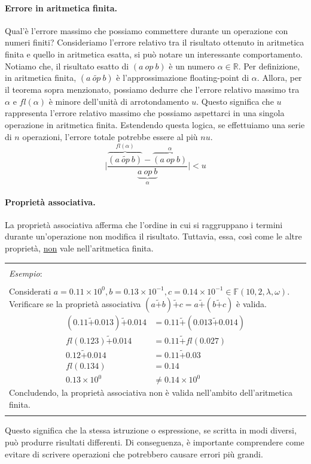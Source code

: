 \documentclass{article}
\numberwithin{equation}{section}
\newenvironment{example}
{\begin{center}
        \begin{tabular}{|p{0.9\textwidth}|}
            \hline \\ 
            \textit{Esempio}: \\\\ 
        }
        {
            \\\\ \hline
        \end{tabular}
    \end{center}
}
\begin{document}
\paragraph{Errore in aritmetica finita.}
Qual'è l'errore massimo che possiamo commettere durante un operazione con numeri
finiti?
Consideriamo l'errore relativo tra il risultato ottenuto in aritmetica finita
e quello in aritmetica esatta, si può notare un interessante comportamento. 
Notiamo che, il risultato esatto di $(a\ op\ b)$ è un numero $\alpha\in
\mathbb{R}$. Per definizione, in aritmetica finita, $(a\ \tilde{op}\ b)$ è
l'approssimazione floating-point di $\alpha$.
Allora, per il teorema sopra menzionato, possiamo dedurre che l'errore relativo massimo tra
$\alpha$ e $fl(\alpha)$ è minore dell'unità di arrotondamento $u$. Questo
significa che $u$ rappresenta l'errore relativo massimo che possiamo
aspettarci in una singola operazione in aritmetica finita.
Estendendo questa logica, se effettuiamo una serie di $n$ operazioni, l'errore
totale potrebbe essere al più $nu$.
$$\Big\lvert \frac{\overset{fl(\alpha)}{\overbrace{(a\ \tilde{op}\ b)}}-\overset{\alpha}{\overbrace{(a\ op\
b)}}}{\underset{\alpha}{\underbrace{a\ op\ b}}}\Big\rvert<u$$
\paragraph{Proprietà associativa.} La proprietà associativa afferma che
l'ordine in cui si raggruppano i termini durante un'operazione non modifica il
risultato. Tuttavia, essa, così come le altre proprietà, \underline{non} vale nell'aritmetica finita.
\begin{example}
    Considerati $a=0.11\times10^0,b=0.13\times10^{-1},c=0.14\times10^{-1}\in
    \mathbb{F}(10,2,\lambda,\omega)$.
    Verificare se la proprietà associativa
    $(a\tilde+b)\tilde+c=a\tilde+(b\tilde+c)$ è valida.
    \begin{equation*}
        \begin{aligned}
            (0.11\tilde+0.013)\tilde+0.014&=0.11\tilde+(0.013\tilde+0.014) \\ 
            fl(0.123)\tilde+0.014&=0.11\tilde+fl(0.027)\\ 
            0.12\tilde+0.014&=0.11\tilde+0.03 \\ 
            fl(0.134)&=0.14 \\
            0.13\times10^0&\neq0.14\times10^0
        \end{aligned} 
    \end{equation*}
    Concludendo, la proprietà associativa non è valida nell'ambito dell'aritmetica finita.
\end{example}
Questo significa che la stessa istruzione o espressione, se scritta in modi
diversi, può produrre risultati differenti. 
Di conseguenza, è importante comprendere come evitare di scrivere operazioni che
potrebbero causare errori più grandi.
\end{document}
